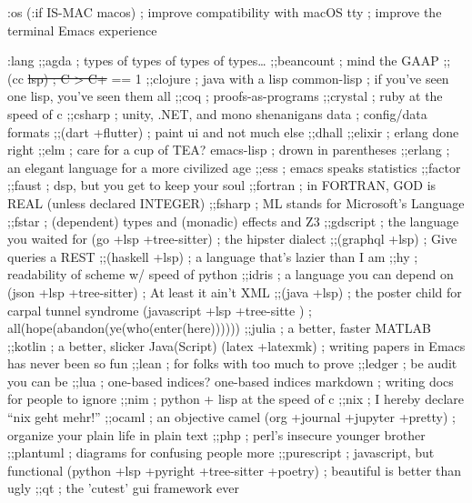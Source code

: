 \documentclass[11pt]{article}
\begin{document}
:os
(:if IS-MAC macos)  ; improve compatibility with macOS
tty               ; improve the terminal Emacs experience

:lang
;;agda              ; types of types of types of types\ldots{}
;;beancount         ; mind the GAAP
;;(cc \sout{lsp)         ; C > C+} == 1
;;clojure           ; java with a lisp
common-lisp       ; if you've seen one lisp, you've seen them all
;;coq               ; proofs-as-programs
;;crystal           ; ruby at the speed of c
;;csharp            ; unity, .NET, and mono shenanigans
data              ; config/data formats
;;(dart +flutter)   ; paint ui and not much else
;;dhall
;;elixir            ; erlang done right
;;elm               ; care for a cup of TEA?
emacs-lisp        ; drown in parentheses
;;erlang            ; an elegant language for a more civilized age
;;ess               ; emacs speaks statistics
;;factor
;;faust             ; dsp, but you get to keep your soul
;;fortran           ; in FORTRAN, GOD is REAL (unless declared INTEGER)
;;fsharp            ; ML stands for Microsoft's Language
;;fstar             ; (dependent) types and (monadic) effects and Z3
;;gdscript          ; the language you waited for
(go +lsp +tree-sitter)         ; the hipster dialect
;;(graphql +lsp)    ; Give queries a REST
;;(haskell +lsp)    ; a language that's lazier than I am
;;hy                ; readability of scheme w/ speed of python
;;idris             ; a language you can depend on
(json +lsp +tree-sitter)              ; At least it ain't XML
;;(java +lsp)       ; the poster child for carpal tunnel syndrome
(javascript +lsp +tree-sitte )        ; all(hope(abandon(ye(who(enter(here))))))
;;julia             ; a better, faster MATLAB
;;kotlin            ; a better, slicker Java(Script)
(latex +latexmk)             ; writing papers in Emacs has never been so fun
;;lean              ; for folks with too much to prove
;;ledger            ; be audit you can be
;;lua               ; one-based indices? one-based indices
markdown          ; writing docs for people to ignore
;;nim               ; python + lisp at the speed of c
;;nix               ; I hereby declare ``nix geht mehr!''
;;ocaml             ; an objective camel
(org +journal +jupyter +pretty)               ; organize your plain life in plain text
;;php               ; perl's insecure younger brother
;;plantuml          ; diagrams for confusing people more
;;purescript        ; javascript, but functional
(python +lsp +pyright +tree-sitter +poetry)            ; beautiful is better than ugly
;;qt                ; the 'cutest' gui framework ever
\end{document}
